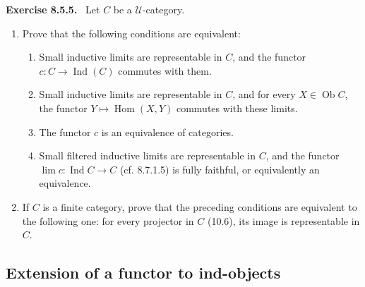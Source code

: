 \documentclass[11pt]{article}
\newcommand{\U}{\mathcal{U}}
\newcommand{\Ob}{\operatorname{Ob}}
\newcommand{\Hom}{\operatorname{Hom}}
\newcommand{\Ind}{\operatorname{Ind}}
\newenvironment{statement}[1]{\par\medskip\noindent\textbf{#1.}\ }{\par\medskip}
\begin{document}
\begin{statement}{Exercise 8.5.5}
Let $C$ be a $\U$-category.
\begin{enumerate}[label=\alph*)]
\item Prove that the following conditions are equivalent:
\begin{enumerate}[label=(\roman*)]
\item Small inductive limits are representable in $C$, and the functor $c:C\to\Ind(C)$ commutes with them.
\item Small inductive limits are representable in $C$, and for every $X\in\Ob C$, the functor $Y\mapsto\Hom(X,Y)$ commutes with these limits.
\item The functor $c$ is an equivalence of categories.
\item Small filtered inductive limits are representable in $C$, and the functor $\lim c:\Ind C\to C$ (cf. 8.7.1.5) is fully faithful, or equivalently an equivalence.
\end{enumerate}

\item If $C$ is a finite category, prove that the preceding conditions are equivalent to the following one: for every projector in $C$ (10.6), its image is representable in $C$.
\end{enumerate}
\end{statement}

\subsection{Extension of a functor to ind-objects}
\end{document}
